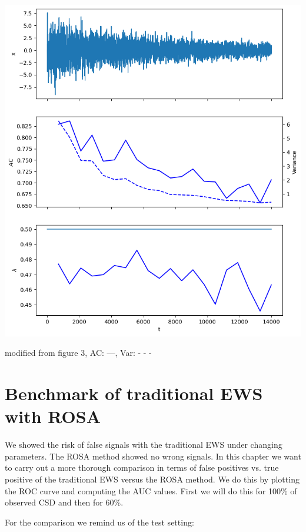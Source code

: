 \documentclass[%
thesis=student,%
coverpage=false,%
titlepage=false,%
headmarks=true, %
german,%
font=libertine, %
math=newpxtx, %
BCOR=5mm,%
coverBCOR=11mm%
]{tumbook}
\begin{document}
    \begin{minipage}{0.49\textwidth}
        \centering
        \includegraphics[width=\textwidth]{figures/true_negative.png}
    \end{minipage}
    \begin{minipage}{\textwidth}
    \centering
    modified from \cite{Morr:2024} figure 3, AC: ---, Var: - - -
\end{minipage}
    


\chapter{Benchmark of traditional EWS with ROSA}

We showed the risk of false signals with the traditional EWS under changing parameters.
The ROSA method showed no wrong signals.
In this chapter we want to carry out a more thorough comparison in terms of false positives vs. true positive of the traditional EWS versus the ROSA method. We do this by plotting the ROC curve and computing the AUC values. First we will do this for 100\% of observed CSD and then for 60\%.

For the comparison we remind us of the test setting: 
\end{document}
